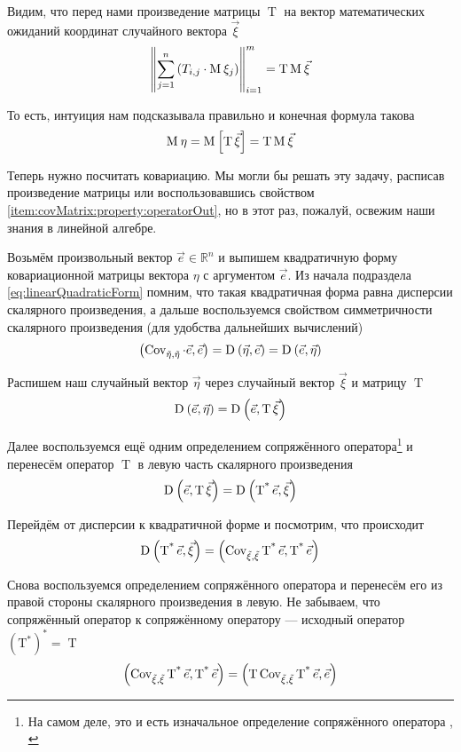 Видим, что перед нами произведение матрицы $\operatorname{T}$ на вектор
математических ожиданий координат случайного вектора $\vec{\xi}$
$$\left\| \sum_{j=1}^n \left( T_{i,j} \cdot \operatorname{M}_{} \xi_j \right)
    \right\|_{i=1}^m = \operatorname{T} \operatorname{M}_{} \vec{\xi} $$

То есть, интуиция нам подсказывала правильно и конечная формула такова
$$\operatorname{M}_{} \eta
    = \operatorname{M}_{} \left[ \operatorname{T} \vec{\xi}  \right]
    = \operatorname{T} \operatorname{M}_{} \vec{\xi} $$

Теперь нужно посчитать ковариацию. Мы могли бы решать эту задачу,
расписав произведение матрицы или воспользовавшись свойством
\ref{item:covMatrix:property:operatorOut}, но в этот раз, пожалуй, освежим
наши знания в линейной алгебре.

Возьмём произвольный вектор $\vec{e} \in \mathbb{R}^n$
и выпишем квадратичную форму ковариационной матрицы вектора $\eta$
с аргументом $\vec{e}$. Из начала подраздела \eqref{eq:linearQuadraticForm}
помним, что такая квадратичная форма равна дисперсии скалярного произведения, а
дальше воспользуемся свойством симметричности скалярного произведения
(для удобства дальнейших вычислений)
$$\left( \operatorname{Cov^{}_{\vec{\eta}, \vec{\eta}}} \cdot \vec{e}, \vec{e} \right)
    = \operatorname{D}_{} \left( \vec{\eta}, \vec{e} \right)
    = \operatorname{D}_{} \left( \vec{e}, \vec{\eta} \right)$$

Распишем наш случайный вектор $\vec{\eta}$ через случайный вектор $\vec{\xi}$
и матрицу $\operatorname{T}$
$$\operatorname{D}_{} \left( \vec{e}, \vec{\eta} \right)
    = \operatorname{D}_{} \left( \vec{e}, \operatorname{T} \vec{\xi} \right)$$

Далее воспользуемся ещё одним определением сопряжённого оператора\footnote{На
самом деле, это и есть изначальное определение сопряжённого оператора
\cite[с.~241]{VoevodinLA}, \cite[с.~126]{IlinPoznyarLA}}
и перенесём оператор $\operatorname{T}$ в левую часть скалярного произведения
$$\operatorname{D}_{} \left( \vec{e}, \operatorname{T} \vec{\xi} \right)
    = \operatorname{D}_{} \left( \operatorname{T^*} \vec{e} , \vec{\xi} \right)$$

Перейдём от дисперсии к квадратичной форме и посмотрим, что происходит
$$\operatorname{D}_{} \left( \operatorname{T^*} \vec{e} , \vec{\xi} \right)
    = \left( \operatorname{\operatorname{Cov^{}_{\vec{\xi}, \vec{\xi}}}} \operatorname{T^*} \vec{e} ,
        \operatorname{T^*} \vec{e} \right)$$

Снова воспользуемся определением сопряжённого оператора и перенесём его
из правой стороны скалярного произведения в левую. Не забываем, что
сопряжённый оператор к сопряжённому оператору --- исходный оператор
$\left( \operatorname{T^*} \right)^* = \operatorname{T}$
$$\left( \operatorname{\operatorname{Cov^{}_{\vec{\xi}, \vec{\xi}}}} \operatorname{T^*} \vec{e},
        \operatorname{T^*} \vec{e} \right)
    = \left( \operatorname{T} \operatorname{\operatorname{Cov^{}_{\vec{\xi}, \vec{\xi}}}} \operatorname{T^*}
            \vec{e}, \vec{e} \right)$$

